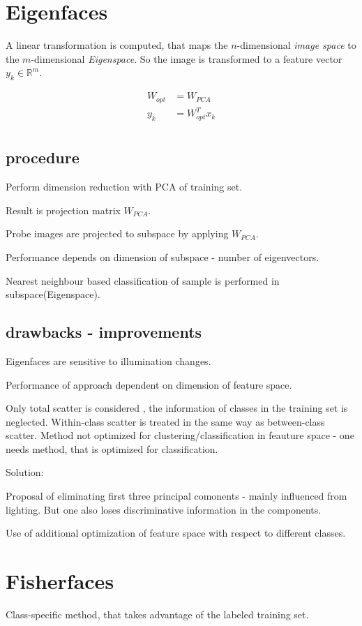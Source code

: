\section{Eigenfaces}
A linear transformation is computed, that maps the $n$-dimensional \textit{image space} to
the $m$-dimensional \textit{Eigenspace}.
So the image is transformed to a feature vector $y_k  \in \mathbb{R}^m$.

\begin{align}
  W_{opt}& =W_{PCA}\\
  y_k    & =W_{opt}^T x_k \\
\end{align}

\subsection{procedure}
Perform dimension reduction with PCA of training set.

Result is projection matrix $W_{PCA}$.

Probe images are projected to subspace by applying $W_{PCA}$.

Performance depends on dimension of subspace - number of eigenvectors.

Nearest neighbour based classification of sample is performed in subspace(Eigenspace).

\subsection{drawbacks - improvements}
Eigenfaces are sensitive to illumination changes.

Performance of approach dependent on dimension of feature space.

Only total scatter is considered , the information of classes in the training set is
neglected. Within-class scatter is treated in the same way as between-class scatter.
Method not optimized for clustering/classification in feauture space - one needs
method, that is optimized for classification.


Solution:

Proposal of eliminating first three principal comonents - mainly influenced from lighting.
But one also loses discriminative information in the components.

Use of additional optimization of feature space with respect to different classes.

\section{Fisherfaces}
 Class-specific method, that takes advantage of the labeled training set.

